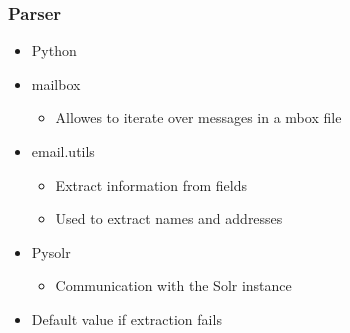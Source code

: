 \documentclass{beamer}
\begin{document}
\begin{frame}
\frametitle{Parser}

\begin{itemize}

\item Python\\
\item mailbox 

\begin{itemize}

\item Allowes to iterate over messages in a mbox file \\

\end{itemize}

\item email.utils

\begin{itemize}

\item Extract information from fields\\

\item Used to extract names and addresses\\

\end{itemize}


\item Pysolr

\begin{itemize}

\item Communication with the Solr instance\\

\end{itemize}



\item Default value if extraction fails


\end{itemize}




\end{frame}
\end{document}
